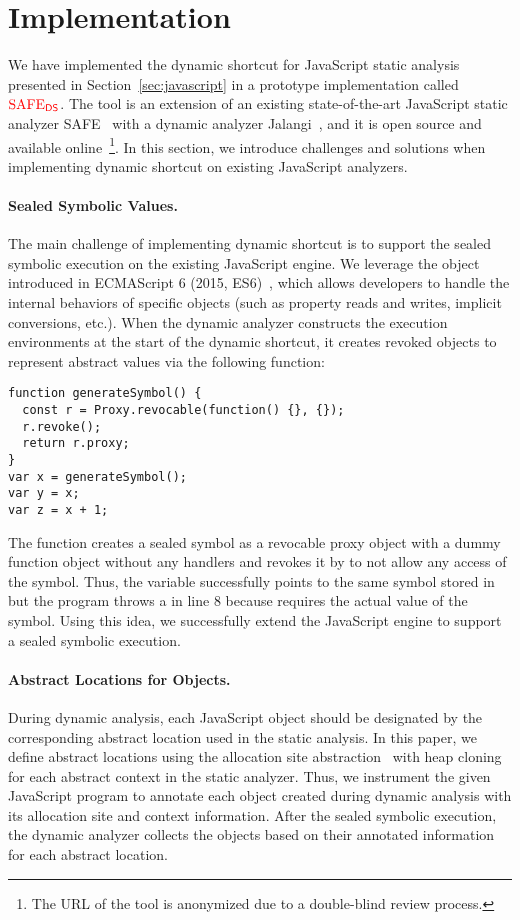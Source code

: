 \section{Implementation}\label{sec:implementation}

We have implemented the dynamic shortcut for JavaScript static analysis
presented in Section~\ref{sec:javascript} in a prototype implementation called
${\color{red}{\text{SAFE}_{\textsf{DS}}}}$.  The tool is an extension of an existing state-of-the-art JavaScript
static analyzer SAFE~\cite{safe, safe2} with a dynamic analyzer
Jalangi~\cite{jalangi}, and it is open source and available online~\footnote{The
URL of the tool is anonymized due to a double-blind review process.}.  In this
section, we introduce challenges and solutions when implementing dynamic
shortcut on existing JavaScript analyzers.


\paragraph{Sealed Symbolic Values.}
The main challenge of implementing dynamic shortcut is to support the sealed
symbolic execution on the existing JavaScript engine.  We leverage the 
object introduced in ECMAScript 6 (2015, ES6)~\cite{es6}, which allows
developers to handle the internal behaviors of specific objects (such as
property reads and writes, implicit conversions, etc.).  When the dynamic
analyzer constructs the execution environments at the start of the dynamic
shortcut, it creates revoked  objects to represent abstract values
via the following  function:
\begin{lstlisting}[style=myJSstyle]
function generateSymbol() {
  const r = Proxy.revocable(function() {}, {});
  r.revoke();
  return r.proxy;
}
var x = generateSymbol();
var y = x;
var z = x + 1;
\end{lstlisting}
The function creates a sealed symbol as a revocable proxy object with a dummy
function object without any handlers and revokes it by
 to not allow any access of the symbol.  Thus, the
variable  successfully points to the same symbol stored in 
but the program throws a  in line 8 because 
requires the actual value of the symbol.  Using this idea, we successfully
extend the JavaScript engine to support a sealed symbolic execution.


\paragraph{Abstract Locations for Objects.}
During dynamic analysis, each JavaScript object should be designated by the
corresponding abstract location used in the static analysis.  In this paper, we
define abstract locations using the allocation site
abstraction~\cite{allocation-site} with heap cloning~\cite{heap-cloning} for
each abstract context in the static analyzer.  Thus, we instrument the given
JavaScript program to annotate each object created during dynamic analysis with
its allocation site and context information.  After the sealed symbolic
execution, the dynamic analyzer collects the objects based on their annotated
information for each abstract location.


